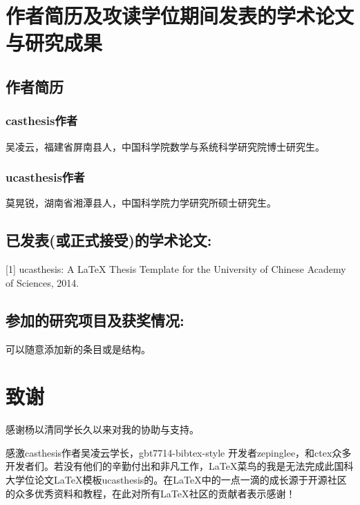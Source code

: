 \chapter{作者简历及攻读学位期间发表的学术论文与研究成果}

\section*{作者简历}

\subsection*{casthesis作者}

吴凌云，福建省屏南县人，中国科学院数学与系统科学研究院博士研究生。

\subsection*{ucasthesis作者}

莫晃锐，湖南省湘潭县人，中国科学院力学研究所硕士研究生。

\section*{已发表(或正式接受)的学术论文:}

[1] ucasthesis: A LaTeX Thesis Template for the University of Chinese Academy of Sciences, 2014.


\section*{参加的研究项目及获奖情况:}

可以随意添加新的条目或是结构。

\chapter[致谢]{致\quad 谢}%
\thispagestyle{noheaderstyle}%


感谢杨以清同学长久以来对我的协助与支持。

感激casthesis作者吴凌云学长，gbt7714-bibtex-style
开发者zepinglee，和ctex众多开发者们。若没有他们的辛勤付出和非凡工作，\LaTeX{}菜鸟的我是无法完成此国科大学位论文\LaTeX{}模板ucasthesis的。在\LaTeX{}中的一点一滴的成长源于开源社区的众多优秀资料和教程，在此对所有\LaTeX{}社区的贡献者表示感谢！

